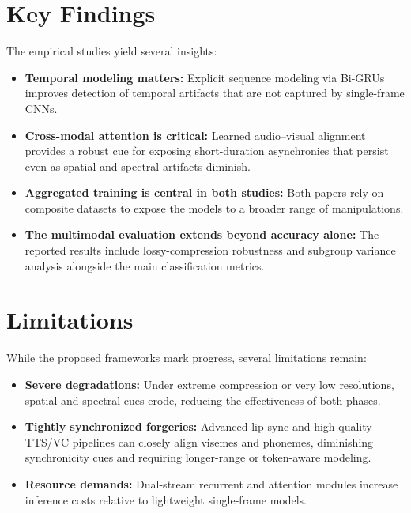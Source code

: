 \section{Key Findings}
The empirical studies yield several insights:
\begin{itemize}
    \item \textbf{Temporal modeling matters:} Explicit sequence modeling via Bi-GRUs improves detection of temporal artifacts that are not captured by single-frame CNNs.
    \item \textbf{Cross-modal attention is critical:} Learned audio--visual alignment provides a robust cue for exposing short-duration asynchronies that persist even as spatial and spectral artifacts diminish.
    \item \textbf{Aggregated training is central in both studies:} Both papers rely on composite datasets to expose the models to a broader range of manipulations.
    \item \textbf{The multimodal evaluation extends beyond accuracy alone:} The reported results include lossy-compression robustness and subgroup variance analysis alongside the main classification metrics.
\end{itemize}

\section{Limitations}
While the proposed frameworks mark progress, several limitations remain:
\begin{itemize}
    \item \textbf{Severe degradations:} Under extreme compression or very low resolutions, spatial and spectral cues erode, reducing the effectiveness of both phases.
    \item \textbf{Tightly synchronized forgeries:} Advanced lip-sync and high-quality TTS/VC pipelines can closely align visemes and phonemes, diminishing synchronicity cues and requiring longer-range or token-aware modeling.
    \item \textbf{Resource demands:} Dual-stream recurrent and attention modules increase inference costs relative to lightweight single-frame models.
\end{itemize}

